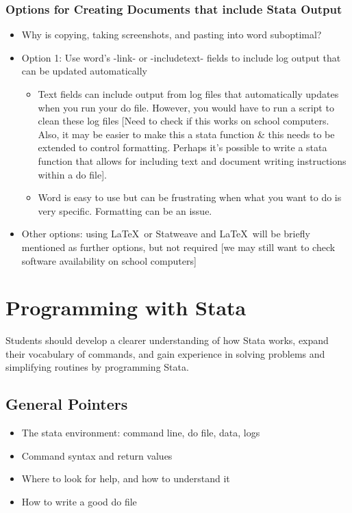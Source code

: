 \documentclass{scrartcl}
\begin{document}
\subsubsection{Options for Creating Documents that include Stata Output}
\begin{itemize}
  \item Why is copying, taking screenshots, and pasting into word suboptimal?
  \item Option 1: Use word's -link- or -includetext- fields to include log output that can be updated automatically
  \begin{itemize}
    \item Text fields can include output from log files that automatically updates when you run your do file. However, you would have to run a script to clean these log files [Need to check if this works on school computers. Also, it may be easier to make this a stata function \& this needs to be extended to control formatting. Perhaps it's possible to write a stata function that allows for including text and document writing instructions within a do file].
    \item Word is easy to use but can be frustrating when what you want to do is very specific. Formatting can be an issue.
  \end{itemize}
  \item Other options: using \LaTeX\ or Statweave and \LaTeX\ will be briefly mentioned as further options, but not required [we may still want to check software availability on school computers]
\end{itemize}

\section{Programming with Stata}
Students should develop a clearer understanding of how Stata works, expand their vocabulary of commands, and gain experience in solving problems and simplifying routines by programming Stata.
\subsection{General Pointers}
\begin{itemize}
\item The stata environment: command line, do file, data, logs
\item Command syntax and return values
\item Where to look for help, and how to understand it
\item How to write a good do file
\end{itemize}
\end{document}
